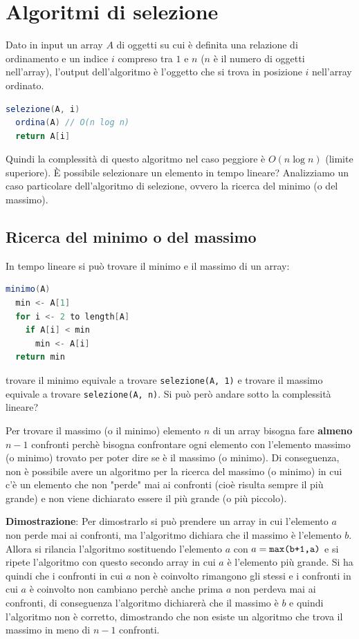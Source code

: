 \documentclass[a4paper]{article}
\begin{document}
\section{Algoritmi di selezione}
Dato in input un array \( A \) di oggetti su cui è definita una relazione di ordinamento
e un indice \( i \) compreso tra \( 1 \) e \( n \) (\( n \) è il numero di oggetti
nell'array), l'output dell'algoritmo è l'oggetto che si trova in posizione \( i \)
nell'array ordinato.
\begin{lstlisting}[language=Scala]
selezione(A, i)
  ordina(A) // O(n log n)
  return A[i]
\end{lstlisting}
Quindi la complessità di questo algoritmo nel caso peggiore è \( O(n \log n) \)
(limite superiore). È possibile selezionare un elemento in tempo lineare? Analizziamo
un caso particolare dell'algoritmo di selezione, ovvero la ricerca del minimo (o del massimo).


\subsection{Ricerca del minimo o del massimo}
\vspace{1em}
\noindent
In tempo lineare si può trovare il minimo e il massimo
di un array:
\begin{lstlisting}[language=Scala]
minimo(A)
  min <- A[1]
  for i <- 2 to length[A]
    if A[i] < min
      min <- A[i]
  return min
\end{lstlisting}
trovare il minimo equivale a trovare \texttt{selezione(A, 1)} e trovare il massimo
equivale a trovare \texttt{selezione(A, n)}. Si può però andare sotto la complessità
lineare?

\vspace{1em}
\noindent
Per trovare il massimo (o il minimo) elemento \( n \) di un array bisogna fare
\textbf{almeno} \( n-1 \) confronti perchè bisogna confrontare ogni elemento con
l'elemento massimo (o minimo) trovato per poter dire se è il massimo (o minimo).
Di conseguenza, non è possibile avere un algoritmo per la ricerca del massimo (o minimo)
in cui c'è un elemento che non "perde" mai ai confronti (cioè risulta sempre il più 
grande) e non viene dichiarato essere il più grande (o più piccolo).

\vspace{1em}
\noindent
\textbf{Dimostrazione}:
Per dimostrarlo si può prendere un array in cui l'elemento \( a \) non perde mai ai
confronti, ma l'algoritmo dichiara che il massimo è l'elemento \( b \). Allora si rilancia
l'algoritmo sostituendo l'elemento \( a \) con \( a = \text{\texttt{max(b+1,a)}} \) e si
ripete l'algoritmo con questo secondo array in cui \( a \) è l'elemento più grande. Si ha
quindi che i confronti in cui \( a \) non è coinvolto rimangono gli stessi e i confronti
in cui \( a \) è coinvolto non cambiano perchè anche prima \( a \) non perdeva mai ai
confronti, di conseguenza l'algoritmo dichiarerà che il massimo è \( b \) e quindi
l'algoritmo non è corretto, dimostrando che non esiste un algoritmo che trova il massimo
in meno di \( n-1 \) confronti.
\end{document}
